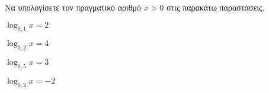 Να υπολογίσετε τον πραγματικό αριθμό $ x>0 $ στις παρακάτω παραστάσεις.
\begin{multicols}{2}
\begin{rlist}
\item $ \log_{0{,}1}{x}=2 $
\item $ \log_{0{,}2}{x}=4 $
\item $ \log_{0{,}5}{x}=3 $
\item $ \log_{0{,}2}{x}=-2 $
\end{rlist}
\end{multicols}
